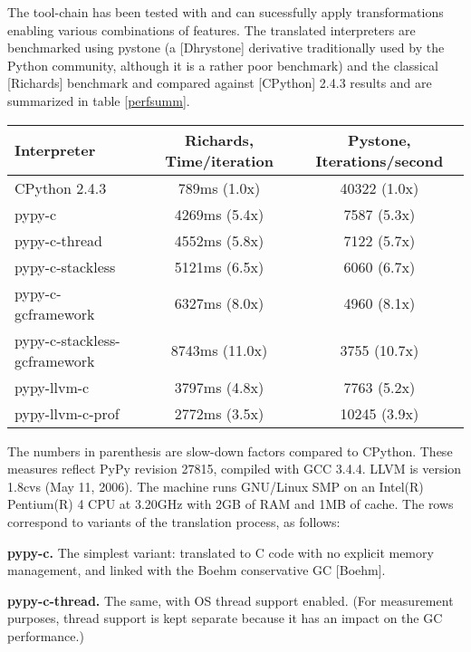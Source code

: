 \documentclass{acm_proc_article-sp}
\begin{document}
The tool-chain has been tested with and can sucessfully apply
transformations enabling various combinations of features. The
translated interpreters are benchmarked using pystone (a [Dhrystone]
derivative traditionally used by the Python community, although it is
a rather poor benchmark) and the classical [Richards] benchmark and
compared against [CPython] 2.4.3 results and are summarized in table
\ref{perfsumm}.

\begin{table*}
\centering
\caption{Summary of interpreter performance}
\label{perfsumm}
\begin{tabular}{|l|c|c|} \hline
\textbf{Interpreter} & 
\textbf{Richards, Time/iteration} &
\textbf{Pystone, Iterations/second} \\ \hline
CPython 2.4.3                &   789ms  (1.0x) & 40322  (1.0x) \\ \hline
pypy-c                       &  4269ms  (5.4x) &  7587  (5.3x) \\ \hline
pypy-c-thread                &  4552ms  (5.8x) &  7122  (5.7x) \\ \hline
pypy-c-stackless             &  5121ms  (6.5x) &  6060  (6.7x) \\ \hline
pypy-c-gcframework           &  6327ms  (8.0x) &  4960  (8.1x) \\ \hline
pypy-c-stackless-gcframework &  8743ms (11.0x) &  3755 (10.7x) \\ \hline
pypy-llvm-c                  &  3797ms  (4.8x) &  7763  (5.2x) \\ \hline
pypy-llvm-c-prof             &  2772ms  (3.5x) & 10245  (3.9x) \\ \hline
\end{tabular}
\end{table*}

The numbers in parenthesis are slow-down factors compared to CPython.
These measures reflect PyPy revision 27815, compiled with GCC 3.4.4.
LLVM is version 1.8cvs (May 11, 2006).  The machine runs GNU/Linux SMP
on an Intel(R) Pentium(R) 4 CPU at 3.20GHz with 2GB of RAM and 1MB of
cache.  The rows correspond to variants of the translation process, as
follows:

{\bf pypy-c.}
    The simplest variant: translated to C code with no explicit memory
    management, and linked with the Boehm conservative GC [Boehm].

{\bf pypy-c-thread.}
    The same, with OS thread support enabled.  (For measurement purposes,
    thread support is kept separate because it has an impact on the GC
    performance.)
\end{document}
